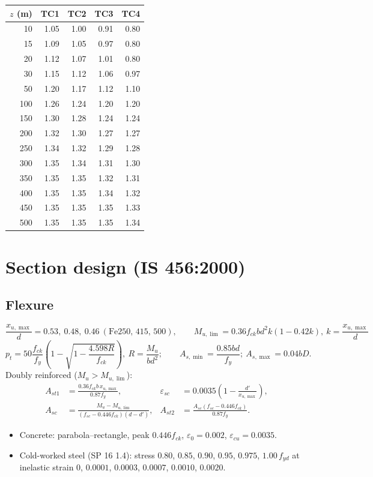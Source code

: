 \documentclass[10pt,a4paper]{article}
\newcommand{\fck}{f_{ck}}
\newcommand{\fy}{f_{y}}
\begin{document}
\begin{longtable}{rrrrr}
\toprule $z$ (m) & TC1 & TC2 & TC3 & TC4 \\ \midrule \endhead
10 & 1.05 & 1.00 & 0.91 & 0.80 \\ 15 & 1.09 & 1.05 & 0.97 & 0.80 \\ 20 & 1.12 & 1.07 & 1.01 & 0.80 \\
30 & 1.15 & 1.12 & 1.06 & 0.97 \\ 50 & 1.20 & 1.17 & 1.12 & 1.10 \\ 100 & 1.26 & 1.24 & 1.20 & 1.20 \\
150 & 1.30 & 1.28 & 1.24 & 1.24 \\ 200 & 1.32 & 1.30 & 1.27 & 1.27 \\ 250 & 1.34 & 1.32 & 1.29 & 1.28 \\
300 & 1.35 & 1.34 & 1.31 & 1.30 \\ 350 & 1.35 & 1.35 & 1.32 & 1.31 \\ 400 & 1.35 & 1.35 & 1.34 & 1.32 \\
450 & 1.35 & 1.35 & 1.35 & 1.33 \\ 500 & 1.35 & 1.35 & 1.35 & 1.34 \\ \bottomrule
\end{longtable}

\section{Section design (IS 456:2000)}
\subsection{Flexure}
\[
\frac{x_{u,\max}}{d}=0.53,\ 0.48,\ 0.46\ (\text{Fe250, 415, 500}),\qquad
M_{u,\lim}=0.36\fck b d^2 k(1-0.42k),\ k=\frac{x_{u,\max}}d
\]
\[
p_t=50\frac{\fck}{\fy}\left(1-\sqrt{1-\frac{4.598R}{\fck}}\right),\ R=\frac{M_u}{bd^2};\qquad
A_{s,\min}=\frac{0.85bd}{\fy};\ A_{s,\max}=0.04bD.
\]
Doubly reinforced ($M_u>M_{u,\lim}$):
\begin{align*}
A_{st1}&=\frac{0.36\fck b\,x_{u,\max}}{0.87\fy}, &
\varepsilon_{sc}&=0.0035\left(1-\frac{d'}{x_{u,\max}}\right),\\
A_{sc}&=\frac{M_u-M_{u,\lim}}{(f_{sc}-0.446\fck)(d-d')}, &
A_{st2}&=\frac{A_{sc}(f_{sc}-0.446\fck)}{0.87\fy}.
\end{align*}
\begin{itemize}
\item Concrete: parabola--rectangle, peak $0.446\fck$, $\varepsilon_0=0.002$, $\varepsilon_{cu}=0.0035$.
\item Cold-worked steel (SP 16 1.4): stress $0.80$, $0.85$, $0.90$, $0.95$, $0.975$, $1.00\,f_{yd}$ at inelastic
strain $0$, $0.0001$, $0.0003$, $0.0007$, $0.0010$, $0.0020$.
\end{itemize}
\end{document}
